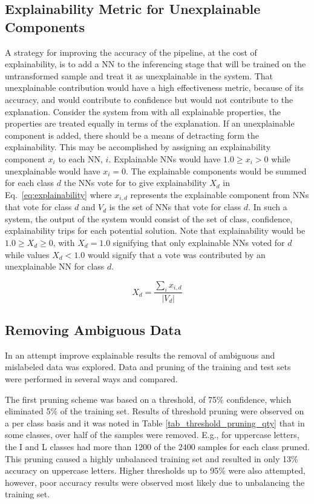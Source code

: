 \documentclass[conference]{IEEEtran}
\begin{document}
\subsection{Explainability Metric for Unexplainable Components}

A strategy for improving the accuracy of the pipeline, at the cost of
explainability, is to add a NN to the inferencing stage that will be trained on
the untransformed sample and treat it as unexplainable in the system.  That
unexplainable contribution would have a high effectiveness metric, because of
its accuracy, and would contribute to confidence but would not contribute to the
explanation.  Consider the system from \cite{whitten21} with all explainable
properties, the properties are treated equally in terms of the explanation. If
an unexplainable component is added, there should be a means of detracting form
the explainability. This may be accomplished by assigning an explainability
component $x_i$ to each NN, $i$.  Explainable NNs would have $1.0 \geq x_i > 0$
while unexplainable would have $x_i = 0$.  The explainable components would be
summed for each class $d$ the NNs vote for to give explainability $X_d$ in
Eq.~\ref{eq:explainability} where $x_{i,d}$ represents the explainable component
from NNs that vote for class $d$ and $V_d$ is the set of NNs that vote for class
$d$.  In such a system, the output of the system would consist of the set of
class, confidence, explainability trips for each potential solution.  Note that
explainability would be $1.0 \geq X_d \geq 0$, with $X_d = 1.0$ signifying that
only explainable NNs voted for $d$ while values $X_d < 1.0$ would signify that a
vote was contributed by an unexplainable NN for class $d$.


\begin{equation}
    X_d=\frac{\sum_i x_{i,d}}{|V_d|}
    \label{eq:explainability}
\end{equation}

\subsection{Removing Ambiguous Data}

In an attempt improve explainable results the removal of ambiguous and
mislabeled data was explored. Data and pruning of the training and test sets
were performed in several ways and compared.

The first pruning scheme was based on a threshold, of 75\% confidence, which
eliminated 5\% of the training set. Results of threshold pruning were observed
on a per class basis and it was noted in Table \ref{tab_threshold_pruning_qty}
that in some classes, over half of the samples were removed.  E.g., for
uppercase letters, the I and L classes had more than 1200 of the 2400 samples
for each class pruned. This pruning caused a highly unbalanced training set and
resulted in only 13\% accuracy on uppercase letters.  Higher thresholds up to
95\% were also attempted, however, poor accuracy results were observed most
likely due to unbalancing the training set.
\end{document}
